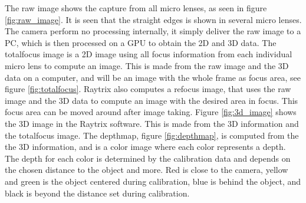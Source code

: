 The raw image shows the capture from all micro lenses, as seen in figure \ref{fig:raw_image}. It is seen that the straight edges is shown in several micro lenses. The camera perform no processing internally, it simply deliver the raw image to a PC, which is then processed on a GPU to obtain the 2D and 3D data. 
The totalfocus image is a 2D image using all focus information from each individual micro lens to compute an image. This is made from the raw image and the 3D data on a computer, and will be an image with the whole frame as focus area, see figure \ref{fig:totalfocus}. 
Raytrix also computes a refocus image, that uses the raw image and the 3D data to compute an image with the desired area in focus. This focus area can be moved around after image taking.
Figure \ref{fig:3d_image} shows the 3D image in the Raytrix software. This is made from the 3D information and the totalfocus image. 
The depthmap, figure \ref{fig:depthmap}, is computed from the the 3D information, and is a color image where each color represents a depth. The depth for each color is determined by the calibration data and depends on the chosen distance to the object and more. 
Red is close to the camera, yellow and green is the object centered during calibration, blue is behind the object, and black is beyond the distance set during calibration.


